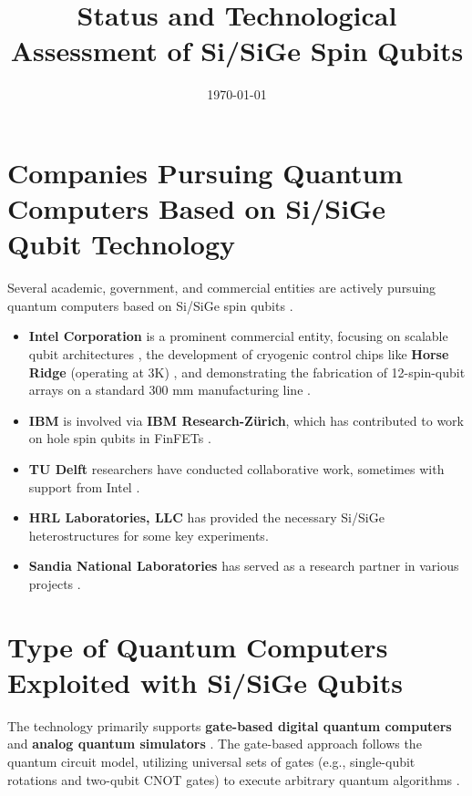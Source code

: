 
\title{Status and Technological Assessment of Si/SiGe Spin Qubits}
\date{\today}



\maketitle



\section{Companies Pursuing Quantum Computers Based on Si/SiGe Qubit Technology}

Several academic, government, and commercial entities are actively pursuing quantum computers based on Si/SiGe spin qubits \cite{ref1, ref2, ref5, ref6, ref10}.

\begin{itemize}
    \item \textbf{Intel Corporation} is a prominent commercial entity, focusing on scalable qubit architectures \cite{ref5}, the development of cryogenic control chips like \textbf{Horse Ridge} (operating at 3K) \cite{ref6}, and demonstrating the fabrication of 12-spin-qubit arrays on a standard 300 mm manufacturing line \cite{ref10}.
    \item \textbf{IBM} is involved via \textbf{IBM Research-Zürich}, which has contributed to work on hole spin qubits in FinFETs \cite{ref6}.
    \item \textbf{TU Delft} researchers have conducted collaborative work, sometimes with support from Intel \cite{ref2}.
    \item \textbf{HRL Laboratories, LLC} has provided the necessary Si/SiGe heterostructures for some key experiments.
    \item \textbf{Sandia National Laboratories} has served as a research partner in various projects \cite{ref1}.
\end{itemize}

\section{Type of Quantum Computers Exploited with Si/SiGe Qubits}

The technology primarily supports \textbf{gate-based digital quantum computers} and \textbf{analog quantum simulators} \cite{ref2, ref9}. The gate-based approach follows the quantum circuit model, utilizing universal sets of gates (e.g., single-qubit rotations and two-qubit CNOT gates) to execute arbitrary quantum algorithms \cite{ref2}.

